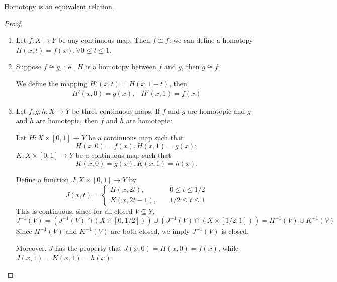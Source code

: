 \begin{proposition}
Homotopy is an equivalent relation.
\end{proposition}
\begin{proof}
\begin{enumerate}
\item
Let $f:X\to Y$ be any continuous map. Then $f\cong f$:
we can define a homotopy $H(x,t) = f(x),\forall 0\le t\le 1$.
\item
Suppose $f\cong g$, i.e., $H$ is a homotopy between $f$ and $g$, then $g\cong f$:

We define the mapping $H'(x,t) = H(x,1-t)$, 
then 
\[
\begin{array}{ll}
H'(x,0)=g(x),
&
H'(x,1)=f(x)
\end{array}
\]
\item
Let $f,g,h:X\to Y$ be three continuous maps.
If $f$ and $g$ are homotopic and $g$ and $h$ are homotopic, then $f$ and $h$ are homotopic:

Let $H:X\times[0,1]\to Y$ be a continuous map such that 
\[
H(x,0)=f(x),H(x,1)=g(x);
\]
$K:X\times[0,1]\to Y$ be a continuous map such that 
\[
K(x,0)=g(x),K(x,1)=h(x).
\]

Define a function $J:X\times[0,1]\to Y$ by
\[
J(x,t)=\left\{
\begin{aligned}
H(x,2t),&\quad 0\le t\le1/2\\
K(x,2t-1),&\quad 1/2\le t\le 1
\end{aligned}
\right.
\]
This is continuous, since for all closed $V\subseteq Y$,
\[
J^{-1}(V)=(J^{-1}(V)\cap(X\times[0,1/2]))\cup(J^{-1}(V)\cap(X\times[1/2,1]))
=
H^{-1}(V)\cup K^{-1}(V)
\]
Since $H^{-1}(V)$ and $K^{-1}(V)$ are both closed, we imply $J^{-1}(V)$ is closed.

Moreover, $J$ has the property that $J(x,0)=H(x,0)=f(x)$, while $J(x,1)=K(x,1)=h(x)$.
\end{enumerate}
\end{proof}




%
%
%

